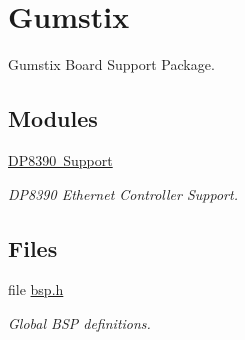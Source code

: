 \hypertarget{group__RTEMSBSPsARMGumstix}{}\section{Gumstix}
\label{group__RTEMSBSPsARMGumstix}


Gumstix Board Support Package.  


\subsection*{Modules}
\begin{DoxyCompactItemize}
\item 
\mbox{\hyperlink{group__gumstix__dp8390}{D\+P8390 Support}}
\begin{DoxyCompactList}\small\item\em D\+P8390 Ethernet Controller Support. \end{DoxyCompactList}\end{DoxyCompactItemize}
\subsection*{Files}
\begin{DoxyCompactItemize}
\item 
file \mbox{\hyperlink{bsps_2arm_2gumstix_2include_2bsp_8h}{bsp.\+h}}
\begin{DoxyCompactList}\small\item\em Global B\+SP definitions. \end{DoxyCompactList}\end{DoxyCompactItemize}
